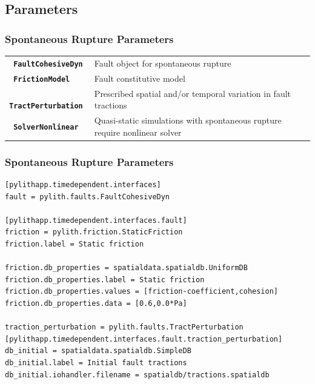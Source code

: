 \documentclass{beamer}
\begin{document}
\subsection{Parameters}

\begin{frame}
  \frametitle{Spontaneous Rupture Parameters}
  
  \begin{tabular}{lp{3in}}
    {\tt\bf\color{green} FaultCohesiveDyn} & Fault object for
    spontaneous rupture \\
    {\tt\bf\color{green}  FrictionModel} & Fault constitutive model \\
    {\tt\bf\color{green}  TractPerturbation} & Prescribed spatial and/or temporal
    variation in fault tractions \\
    {\tt\bf\color{green}  SolverNonlinear} & Quasi-static simulations with
    spontaneous rupture require nonlinear solver
  \end{tabular}
  
\end{frame}


\begin{frame}[fragile]
  \frametitle{Spontaneous Rupture Parameters}

{\small
\begin{verbatim}
[pylithapp.timedependent.interfaces]
fault = pylith.faults.FaultCohesiveDyn

[pylithapp.timedependent.interfaces.fault]
friction = pylith.friction.StaticFriction
friction.label = Static friction

friction.db_properties = spatialdata.spatialdb.UniformDB
friction.db_properties.label = Static friction
friction.db_properties.values = [friction-coefficient,cohesion]
friction.db_properties.data = [0.6,0.0*Pa]

traction_perturbation = pylith.faults.TractPerturbation
[pylithapp.timedependent.interfaces.fault.traction_perturbation]
db_initial = spatialdata.spatialdb.SimpleDB
db_initial.label = Initial fault tractions
db_initial.iohandler.filename = spatialdb/tractions.spatialdb
\end{verbatim}
}
  
\end{frame}
\end{document}

